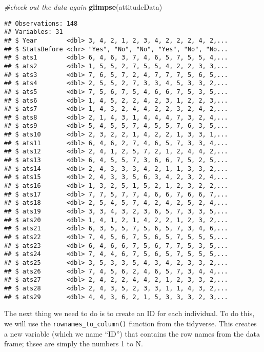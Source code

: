 \documentclass[12pt,]{book}
\newenvironment{Shaded}{\begin{snugshade}}{\end{snugshade}}
\newcommand{\CommentTok}[1]{\textcolor[rgb]{0.56,0.35,0.01}{\textit{#1}}}
\newcommand{\KeywordTok}[1]{\textcolor[rgb]{0.13,0.29,0.53}{\textbf{#1}}}
\newcommand{\NormalTok}[1]{#1}
\begin{document}
\begin{Shaded}
\begin{Highlighting}[]
\CommentTok{#check out the data again}
\KeywordTok{glimpse}\NormalTok{(attitudeData)}
\end{Highlighting}
\end{Shaded}

\begin{verbatim}
## Observations: 148
## Variables: 31
## $ Year        <dbl> 3, 4, 2, 1, 2, 3, 4, 2, 2, 2, 4, 2,...
## $ StatsBefore <chr> "Yes", "No", "No", "Yes", "No", "No...
## $ ats1        <dbl> 6, 4, 6, 3, 7, 4, 6, 5, 7, 5, 5, 4,...
## $ ats2        <dbl> 1, 5, 5, 2, 7, 5, 5, 4, 2, 2, 3, 3,...
## $ ats3        <dbl> 7, 6, 5, 7, 2, 4, 7, 7, 7, 5, 6, 5,...
## $ ats4        <dbl> 2, 5, 5, 2, 7, 3, 3, 4, 5, 3, 3, 2,...
## $ ats5        <dbl> 7, 5, 6, 7, 5, 4, 6, 6, 7, 5, 3, 5,...
## $ ats6        <dbl> 1, 4, 5, 2, 2, 4, 2, 3, 1, 2, 2, 3,...
## $ ats7        <dbl> 1, 4, 3, 2, 4, 4, 2, 2, 3, 2, 4, 2,...
## $ ats8        <dbl> 2, 1, 4, 3, 1, 4, 4, 4, 7, 3, 2, 4,...
## $ ats9        <dbl> 5, 4, 5, 5, 7, 4, 5, 5, 7, 6, 3, 5,...
## $ ats10       <dbl> 2, 3, 2, 2, 1, 4, 2, 2, 1, 3, 3, 1,...
## $ ats11       <dbl> 6, 4, 6, 2, 7, 4, 6, 5, 7, 3, 3, 4,...
## $ ats12       <dbl> 2, 4, 1, 2, 5, 7, 2, 1, 2, 4, 4, 2,...
## $ ats13       <dbl> 6, 4, 5, 5, 7, 3, 6, 6, 7, 5, 2, 5,...
## $ ats14       <dbl> 2, 4, 3, 3, 3, 4, 2, 1, 1, 3, 3, 2,...
## $ ats15       <dbl> 2, 4, 3, 3, 5, 6, 3, 4, 2, 3, 2, 4,...
## $ ats16       <dbl> 1, 3, 2, 5, 1, 5, 2, 1, 2, 3, 2, 2,...
## $ ats17       <dbl> 7, 7, 5, 7, 7, 4, 6, 6, 7, 6, 6, 7,...
## $ ats18       <dbl> 2, 5, 4, 5, 7, 4, 2, 4, 2, 5, 2, 4,...
## $ ats19       <dbl> 3, 3, 4, 3, 2, 3, 6, 5, 7, 3, 3, 5,...
## $ ats20       <dbl> 1, 4, 1, 2, 1, 4, 2, 2, 1, 2, 3, 2,...
## $ ats21       <dbl> 6, 3, 5, 5, 7, 5, 6, 5, 7, 3, 4, 6,...
## $ ats22       <dbl> 7, 4, 5, 6, 7, 5, 6, 5, 7, 5, 5, 5,...
## $ ats23       <dbl> 6, 4, 6, 6, 7, 5, 6, 7, 7, 5, 3, 5,...
## $ ats24       <dbl> 7, 4, 4, 6, 7, 5, 6, 5, 7, 5, 5, 5,...
## $ ats25       <dbl> 3, 5, 3, 3, 5, 4, 3, 4, 2, 3, 3, 2,...
## $ ats26       <dbl> 7, 4, 5, 6, 2, 4, 6, 5, 7, 3, 4, 4,...
## $ ats27       <dbl> 2, 4, 2, 2, 4, 4, 2, 1, 2, 3, 3, 2,...
## $ ats28       <dbl> 2, 4, 3, 5, 2, 3, 3, 1, 1, 4, 3, 2,...
## $ ats29       <dbl> 4, 4, 3, 6, 2, 1, 5, 3, 3, 3, 2, 3,...
\end{verbatim}

The next thing we need to do is to create an ID for each individual. To do this, we will use the \texttt{rownames\_to\_column()} function from the tidyverse. This creates a new variable (which we name ``ID'') that contains the row names from the data frame; thsee are simply the numbers 1 to N.
\end{document}
